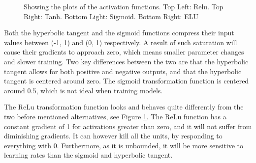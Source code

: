 \documentclass[]{article}
\begin{document}
\begin{figure}[h]
	\centering
	\caption{Showing the plots of the activation functions. Top Left: Relu. Top Right: Tanh. Bottom Light: Sigmoid. Bottom Right: ELU}
	\label{part1-plots}
\end{figure}

Both the hyperbolic tangent and the sigmoid functions compress their input values between (-1, 1) and (0, 1) respectively. A result of such saturation will cause their gradients to approach zero, which means smaller parameter changes and slower training. Two key differences between the two are that the hyperbolic tangent allows for both positive and negative outputs, and that the hyperbolic tangent is centered around zero. The sigmoid transformation function is centered around 0.5, which is not ideal when training models.

The ReLu transformation function looks and behaves quite differently from the two before mentioned alternatives, see Figure \ref{part1-plots}. The ReLu function has a constant gradient of 1 for activations greater than zero, and it will not suffer from diminishing gradients. It can however kill all the units, by responding to everything with 0. Furthermore, as it is unbounded, it will be more sensitive to learning rates than the sigmoid and hyperbolic tangent.
\end{document}

